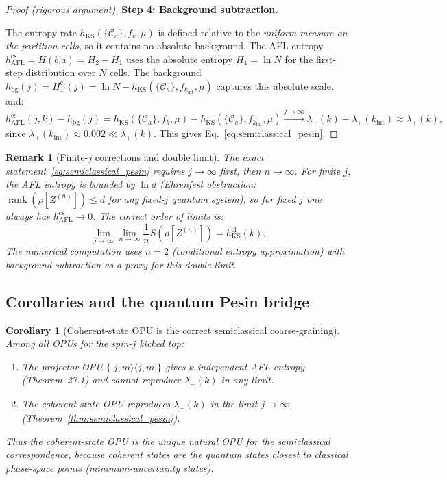 \documentclass[12pt,a4paper]{article}
\newtheorem{corollary}[theorem]{Corollary}
\newtheorem{remark}[theorem]{Remark}
\begin{document}
\begin{proof}[Proof (rigorous argument)]
\noindent\textbf{Step 4: Background subtraction.}

The entropy rate $h_{\mathrm{KS}}(\{\mathcal{C}_a\},f_k,\mu)$ is defined
relative to the \emph{uniform measure on the partition cells}, so it
contains no absolute background.  The AFL entropy $h_{\mathrm{AFL}}^{\mathrm{cs}}
= H(b|a) = H_2 - H_1$ uses the absolute entropy $H_1 = \ln N$ for the
first-step distribution over $N$ cells.  The background
$h_{\mathrm{bg}}(j) = H_1^{\mathrm{cl}}(j) = \ln N - h_{\mathrm{KS}}(\{\mathcal{C}_a\},
f_{k_{\mathrm{int}}},\mu)$ captures this absolute scale, and:
\[
  h_{\mathrm{AFL}}^{\mathrm{cs}}(j,k) - h_{\mathrm{bg}}(j)
  = h_{\mathrm{KS}}(\{\mathcal{C}_a\},f_k,\mu)
    - h_{\mathrm{KS}}(\{\mathcal{C}_a\},f_{k_{\mathrm{int}}},\mu)
  \xrightarrow{j\to\infty}
  \lambda_+(k) - \lambda_+(k_{\mathrm{int}})
  \approx \lambda_+(k),
\]
since $\lambda_+(k_{\mathrm{int}}) \approx 0.002 \ll \lambda_+(k)$.
This gives Eq.~\eqref{eq:semiclassical_pesin}.
\end{proof}

\begin{remark}[Finite-$j$ corrections and double limit]
  The exact statement~\eqref{eq:semiclassical_pesin} requires $j\to\infty$
  first, then $n\to\infty$.  For finite $j$, the AFL entropy is bounded by
  $\ln d$ (Ehrenfest obstruction: $\operatorname{rank}(\rho[Z^{(n)}]) \leq d$ for any
  fixed-$j$ quantum system), so for fixed $j$ one always has $h_{\mathrm{AFL}}^{\mathrm{cs}}\to 0$.
  The correct order of limits is:
  \[
    \lim_{j\to\infty}\lim_{n\to\infty}\frac{1}{n}S(\rho[Z^{(n)}])
    = h_{\mathrm{KS}}^{\mathrm{cl}}(k).
  \]
  The numerical computation uses $n=2$ (conditional entropy approximation)
  with background subtraction as a proxy for this double limit.
\end{remark}

\subsection{Corollaries and the quantum Pesin bridge}

\begin{corollary}[Coherent-state OPU is the correct semiclassical coarse-graining]
  \label{cor:cs_opu_optimal}
  Among all OPUs for the spin-$j$ kicked top:
  \begin{enumerate}
    \item The projector OPU $\{|j,m\rangle\langle j,m|\}$ gives $k$-independent
      AFL entropy (Theorem~27.1) and \emph{cannot} reproduce $\lambda_+(k)$ in any limit.
    \item The coherent-state OPU reproduces $\lambda_+(k)$ in the limit $j\to\infty$
      (Theorem~\ref{thm:semiclassical_pesin}).
  \end{enumerate}
  Thus the coherent-state OPU is the \emph{unique natural OPU} for the semiclassical
  correspondence, because coherent states are the quantum states closest to classical
  phase-space points (minimum-uncertainty states).
\end{corollary}
\end{document}
